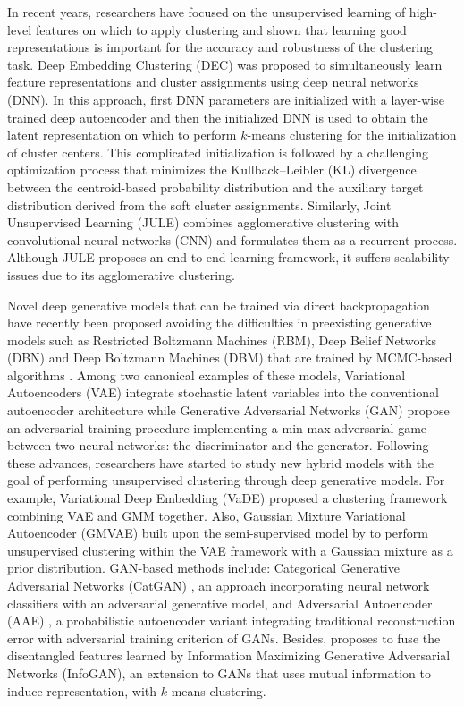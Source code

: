\documentclass{article} \usepackage{iclr2018_conference,times}
\begin{document}
In recent years, researchers have focused on the unsupervised learning of high-level features on which to apply clustering and shown that learning good representations is important for the accuracy and robustness of the clustering task. Deep Embedding Clustering (DEC) \citep{XieGF16} was proposed to simultaneously learn feature representations and cluster assignments using deep neural networks (DNN). In this approach, first DNN parameters are initialized with a layer-wise trained deep autoencoder \citep{VincentLLBM10} and then the initialized DNN is used to obtain the latent representation on which to perform $k$-means clustering for the initialization of cluster centers. This complicated initialization is followed by a challenging optimization process that minimizes the Kullback–Leibler (KL) divergence between the centroid-based probability distribution and the auxiliary target distribution derived from the soft cluster assignments. Similarly, Joint Unsupervised Learning (JULE) \citep{YangPB16} combines agglomerative clustering with convolutional neural networks (CNN) and formulates them as a recurrent process. Although JULE proposes an end-to-end learning framework, it suffers scalability issues due to its agglomerative clustering. 

Novel deep generative models that can be trained via direct backpropagation have recently been proposed avoiding the difficulties in preexisting generative models such as Restricted Boltzmann Machines (RBM), Deep Belief Networks (DBN) and Deep Boltzmann Machines (DBM) that are trained by MCMC-based algorithms \citep{hinton2006fast, boltzmann}. Among two canonical examples of these models, Variational Autoencoders (VAE) \citep{KingmaW13, RezendeMW14} integrate stochastic latent variables into the conventional autoencoder architecture while Generative Adversarial Networks (GAN) \citep{GoodfellowPMXWOCB14} propose an adversarial training procedure implementing a min-max adversarial game between two neural networks: the discriminator and the generator. Following these advances, researchers have started to study new hybrid models with the goal of performing unsupervised clustering through deep generative models. For example, Variational Deep Embedding (VaDE) \citep{JiangZTTZ17} proposed a clustering framework combining VAE and GMM together. Also, Gaussian Mixture Variational Autoencoder (GMVAE) \citep{DilokthanakulMG16} built upon the semi-supervised model by \citet{KingmaMRW14} to perform unsupervised clustering within the VAE framework with a Gaussian mixture as a prior distribution. GAN-based methods include: Categorical Generative Adversarial Networks (CatGAN) \citep{Springenberg15}, an approach incorporating neural network classifiers with an adversarial generative model, and Adversarial Autoencoder (AAE) \citep{MakhzaniSJG15}, a probabilistic autoencoder variant integrating traditional reconstruction error with adversarial training criterion of GANs. Besides, \citet{premachandran2016} proposes to fuse the disentangled features learned by Information Maximizing Generative Adversarial Networks (InfoGAN), an extension to GANs that uses mutual information to induce representation, with $k$-means clustering.
\end{document}
